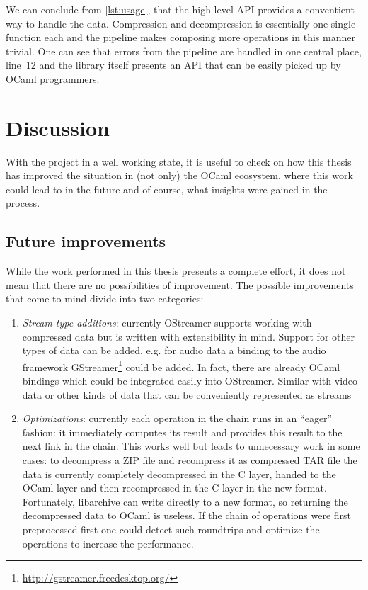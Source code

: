 \documentclass[parskip=half]{scrreprt}
\begin{document}
We can conclude from \autoref{lst:usage}, that the high level API provides a
conventient way to handle the data. Compression and decompression is
essentially one single function each and the pipeline makes composing more
operations in this manner trivial. One can see that errors from the pipeline
are handled in one central place, line~12 and the library itself presents an
API that can be easily picked up by OCaml programmers.

\chapter{Discussion}
\label{sec:discussion}

With the project in a well working state, it is useful to check on how this
thesis has improved the situation in (not only) the OCaml ecosystem, where this
work could lead to in the future and of course, what insights were gained in
the process.

\section{Future improvements}
\label{sec:future}

While the work performed in this thesis presents a complete effort, it does not
mean that there are no possibilities of improvement. The possible improvements
that come to mind divide into two categories:

\begin{enumerate}
  \item \emph{Stream type additions}: currently OStreamer supports working with
    compressed data but is written with extensibility in mind. Support for
    other types of data can be added, e.g. for audio data a binding to the
    audio framework GStreamer\footnote{\url{http://gstreamer.freedesktop.org/}}
    could be added. In fact, there are already OCaml bindings which could be
    integrated easily into OStreamer. Similar with video data or other kinds of
    data that can be conveniently represented as streams
  \item \emph{Optimizations}: currently each operation in the chain runs in an
    \enquote{eager} fashion: it immediately computes its result and provides
    this result to the next link in the chain. This works well but leads to
    unnecessary work in some cases: to decompress a ZIP file and recompress it
    as compressed TAR file the data is currently completely decompressed in
    the C layer, handed to the OCaml layer and then recompressed in the C layer
    in the new format. Fortunately, libarchive can write directly to a new
    format, so returning the decompressed data to OCaml is useless.  If the
    chain of operations were first preprocessed first one could detect such
    roundtrips and optimize the operations to increase the performance.
\end{enumerate}
\end{document}
